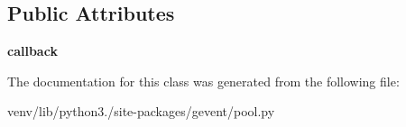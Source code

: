 \subsection*{Public Attributes}
\begin{DoxyCompactItemize}
\item 
\mbox{\label{classgevent_1_1pool_1_1pass__value_a0dae3d6b5eb953de81c18b5ed217fee6}} 
{\bfseries callback}
\end{DoxyCompactItemize}


The documentation for this class was generated from the following file\+:\begin{DoxyCompactItemize}
\item 
venv/lib/python3./site-\/packages/gevent/pool.\+py\end{DoxyCompactItemize}
